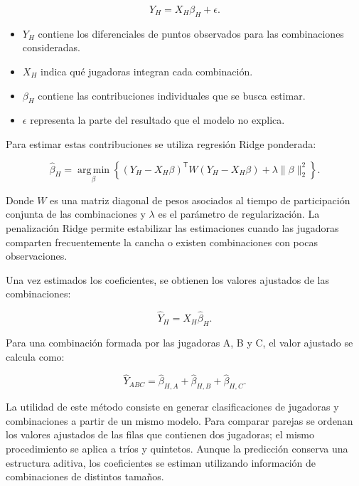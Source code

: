 \begin{equation}
    Y_H = X_H \beta_H + \epsilon.
\end{equation}

\begin{itemize}
    \item $Y_H$ contiene los diferenciales de puntos observados
    para las combinaciones consideradas.
    \item $X_H$ indica qué jugadoras integran cada combinación.
    \item $\beta_H$ contiene las contribuciones individuales
    que se busca estimar.
    \item $\epsilon$ representa la parte del resultado que
    el modelo no explica.
\end{itemize}

Para estimar estas contribuciones se utiliza regresión
Ridge ponderada:

\begin{equation}
    \hat{\beta}_H =
    \underset{\beta}{\operatorname{arg\,min}}
    \left\{
        (Y_H-X_H\beta)^{\mathsf T}
        W(Y_H-X_H\beta)
        + \lambda \|\beta\|_2^2
    \right\}.
\end{equation}

Donde $W$ es una matriz diagonal de pesos asociados al tiempo
de participación conjunta de las combinaciones y $\lambda$
es el parámetro de regularización. La penalización Ridge
permite estabilizar las estimaciones cuando las jugadoras
comparten frecuentemente la cancha o existen combinaciones
con pocas observaciones.
\cite{josephs2025hypergraphadjustedplusminus}

Una vez estimados los coeficientes, se obtienen los valores
ajustados de las combinaciones:

\begin{equation}
    \hat{Y}_H = X_H\hat{\beta}_H.
\end{equation}

Para una combinación formada por las jugadoras
A, B y C, el valor ajustado se calcula como:

\begin{equation}
    \hat{Y}_{ABC} =
    \hat{\beta}_{H,A}
    + \hat{\beta}_{H,B}
    + \hat{\beta}_{H,C}.
\end{equation}

La utilidad de este método consiste en generar clasificaciones
de jugadoras y combinaciones a partir de un mismo modelo.
Para comparar parejas se ordenan los valores ajustados de las
filas que contienen dos jugadoras; el mismo procedimiento
se aplica a tríos y quintetos. Aunque la predicción conserva
una estructura aditiva, los coeficientes se estiman utilizando
información de combinaciones de distintos tamaños.\cite{josephs2025hypergraphadjustedplusminus}

